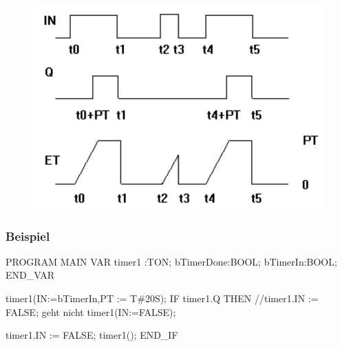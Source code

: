 \documentclass[
  10pt,
  a4paper,
]{article}
\newenvironment{Shaded}{}{}
\newcommand{\NormalTok}[1]{\textcolor[rgb]{0.14,0.16,0.18}{#1}}
\numberwithin{equation}{section}
\begin{document}
\begin{figure}[H]

{\centering \includegraphics{image/TON.png}

}

\end{figure}

\hypertarget{beispiel-2}{%
\subsubsection{Beispiel}\label{beispiel-2}}

\begin{Shaded}
\begin{Highlighting}[]
\NormalTok{PROGRAM MAIN }
\NormalTok{VAR }
\NormalTok{    timer1 :TON; }
\NormalTok{    bTimerDone:BOOL; }
\NormalTok{    bTimerIn:BOOL; }
\NormalTok{END\_VAR}

\NormalTok{timer1(IN:=bTimerIn,PT := T\#20S); }
\NormalTok{IF timer1.Q THEN }
\NormalTok{    //timer1.IN := FALSE; geht nicht}
\NormalTok{    timer1(IN:=FALSE);}

\NormalTok{    timer1.IN := FALSE;}
\NormalTok{    timer1();   }
\NormalTok{END\_IF}
\end{Highlighting}
\end{Shaded}
\end{document}
